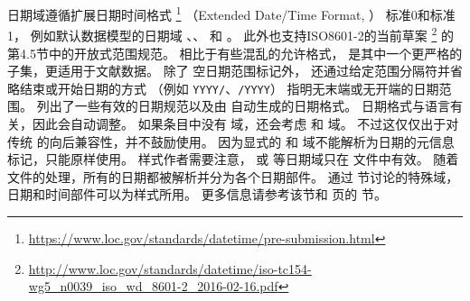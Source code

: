 
日期域遵循扩展日期时间格式%
\footnote{\url{https://www.loc.gov/standards/datetime/pre-submission.html}}
（Extended Date/Time Format, ）
标准0和标准1，
例如默认数据模型的日期域 、、 和 。
此外也支持ISO8601-2的当前草案%
\footnote{\url{http://www.loc.gov/standards/datetime/iso-tc154-wg5_n0039_iso_wd_8601-2_2016-02-16.pdf}}
的第4.5节中的开放式范围规范。
相比于有些混乱的允许格式，
 是其中一个更严格的子集，更适用于文献数据。
除了  空日期范围标记外，
还通过给定范围分隔符并省略结束或开始日期的方式
（例如 \texttt{YYYY/}、\texttt{/YYYY}）
指明无末端或无开端的日期范围。
 列出了一些有效的日期规范以及由 \biblatex 自动生成的日期格式。
日期格式与语言有关，因此会自动调整。
如果条目中没有  域，\biblatex 还会考虑  和  域。
不过这仅仅出于对传统 \BibTeX 的向后兼容性，并不鼓励使用。
因为显式的  和  域不能解析为日期的元信息标记，只能原样使用。
样式作者需要注意， 或   等日期域只在  文件中有效。
随着  文件的处理，所有的日期都被解析并分为各个日期部件。
通过 节讨论的特殊域，日期和时间部件可以为样式所用。
更多信息请参考该节和\pageref{aut:bbx:fld:tab1} 页的 节。


